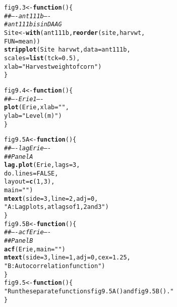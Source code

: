 \documentclass[12pt, a4paper,  BCOR=8.25mm, DIV=15]{scrartcl}\usepackage[]{graphicx}\usepackage[]{color}
\makeatletter
\newcommand{\hlnum}[1]{\textcolor[rgb]{0.686,0.059,0.569}{#1}}%
\newcommand{\hlstr}[1]{\textcolor[rgb]{0.192,0.494,0.8}{#1}}%
\newcommand{\hlcom}[1]{\textcolor[rgb]{0.678,0.584,0.686}{\textit{#1}}}%
\newcommand{\hlopt}[1]{\textcolor[rgb]{0,0,0}{#1}}%
\newcommand{\hlstd}[1]{\textcolor[rgb]{0.345,0.345,0.345}{#1}}%
\newcommand{\hlkwa}[1]{\textcolor[rgb]{0.161,0.373,0.58}{\textbf{#1}}}%
\newcommand{\hlkwb}[1]{\textcolor[rgb]{0.69,0.353,0.396}{#1}}%
\newcommand{\hlkwc}[1]{\textcolor[rgb]{0.333,0.667,0.333}{#1}}%
\newcommand{\hlkwd}[1]{\textcolor[rgb]{0.737,0.353,0.396}{\textbf{#1}}}%
\newenvironment{kframe}{%
 \def\at@end@of@kframe{}%
 \ifinner\ifhmode%
  \def\at@end@of@kframe{\end{minipage}}%
  \begin{minipage}{\columnwidth}%
 \fi\fi%
 \def\FrameCommand##1{\hskip\@totalleftmargin \hskip-\fboxsep
 \colorbox{shadecolor}{##1}\hskip-\fboxsep
     \hskip-\linewidth \hskip-\@totalleftmargin \hskip\columnwidth}%
 \MakeFramed {\advance\hsize-\width
   \@totalleftmargin\z@ \linewidth\hsize
   \@setminipage}}%
 {\par\unskip\endMakeFramed%
 \at@end@of@kframe}
\newenvironment{knitrout}{}{} %
\makeatother
\begin{document}
\begin{knitrout}
\color{fgcolor}\begin{kframe}
\begin{alltt}
\hlstd{fig9.3} \hlkwb{<-} \hlkwa{function}\hlstd{()\{}
\hlcom{## ---- ant111b ----}
\hlcom{# ant111b is in DAAG}
\hlstd{Site} \hlkwb{<-} \hlkwd{with}\hlstd{(ant111b,} \hlkwd{reorder}\hlstd{(site, harvwt,}
                              \hlkwc{FUN}\hlstd{=mean))}
\hlkwd{stripplot}\hlstd{(Site} \hlopt{~} \hlstd{harvwt,} \hlkwc{data}\hlstd{=ant111b,}
          \hlkwc{scales}\hlstd{=}\hlkwd{list}\hlstd{(}\hlkwc{tck}\hlstd{=}\hlnum{0.5}\hlstd{),}
          \hlkwc{xlab}\hlstd{=}\hlstr{"Harvest weight of corn"}\hlstd{)}
\hlstd{\}}
\end{alltt}
\end{kframe}
\end{knitrout}

\begin{knitrout}
\color{fgcolor}\begin{kframe}
\begin{alltt}
\hlstd{fig9.4} \hlkwb{<-} \hlkwa{function}\hlstd{()\{}
\hlcom{## ---- Erie1 ----}
\hlkwd{plot}\hlstd{(Erie,} \hlkwc{xlab}\hlstd{=}\hlstr{""}\hlstd{,}
     \hlkwc{ylab}\hlstd{=}\hlstr{"Level (m)"}\hlstd{)}
\hlstd{\}}
\end{alltt}
\end{kframe}
\end{knitrout}

\begin{knitrout}
\color{fgcolor}\begin{kframe}
\begin{alltt}
\hlstd{fig9.5A} \hlkwb{<-} \hlkwa{function}\hlstd{()\{}
\hlcom{## ---- lagErie ----}
\hlcom{## Panel A}
\hlkwd{lag.plot}\hlstd{(Erie,} \hlkwc{lags}\hlstd{=}\hlnum{3}\hlstd{,}
         \hlkwc{do.lines}\hlstd{=}\hlnum{FALSE}\hlstd{,}
         \hlkwc{layout}\hlstd{=}\hlkwd{c}\hlstd{(}\hlnum{1}\hlstd{,}\hlnum{3}\hlstd{),}
         \hlkwc{main}\hlstd{=}\hlstr{"  "}\hlstd{)}
\hlkwd{mtext}\hlstd{(}\hlkwc{side}\hlstd{=}\hlnum{3}\hlstd{,} \hlkwc{line}\hlstd{=}\hlnum{2}\hlstd{,} \hlkwc{adj}\hlstd{=}\hlnum{0}\hlstd{,}
      \hlstr{"A: Lag plots, at lags of 1, 2 and 3"}\hlstd{)}
\hlstd{\}}
\hlstd{fig9.5B} \hlkwb{<-} \hlkwa{function}\hlstd{()\{}
\hlcom{## ---- acfErie ----}
\hlcom{## Panel B}
\hlkwd{acf}\hlstd{(Erie,} \hlkwc{main}\hlstd{=}\hlstr{""}\hlstd{)}
\hlkwd{mtext}\hlstd{(}\hlkwc{side}\hlstd{=}\hlnum{3}\hlstd{,} \hlkwc{line}\hlstd{=}\hlnum{1}\hlstd{,} \hlkwc{adj}\hlstd{=}\hlnum{0}\hlstd{,} \hlkwc{cex}\hlstd{=}\hlnum{1.25}\hlstd{,}
      \hlstr{"B: Autocorrelation function"}\hlstd{)}
\hlstd{\}}
\hlstd{fig9.5} \hlkwb{<-} \hlkwa{function}\hlstd{()\{}
\hlstr{"Run the separate functions fig9.5A() and fig9.5B()."}
\hlstd{\}}
\end{alltt}
\end{kframe}
\end{knitrout}
\end{document}
